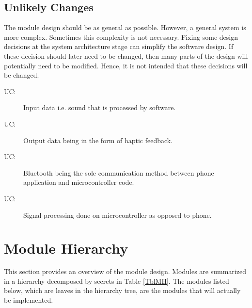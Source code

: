 \documentclass[12pt, titlepage]{article}
\newcounter{ucnum}
\newcommand{\uctheucnum}{UC\theucnum}
\begin{document}
\subsection{Unlikely Changes} \label{SecUchange}

The module design should be as general as possible. However, a general system is
more complex. Sometimes this complexity is not necessary. Fixing some design
decisions at the system architecture stage can simplify the software design. If
these decision should later need to be changed, then many parts of the design
will potentially need to be modified. Hence, it is not intended that these
decisions will be changed.

\begin{description}
  \item[ \uctheucnum \label{uc1}:] Input data i.e. sound that is processed by software.
  \item[ \uctheucnum \label{uc2}:] Output data being in the form of haptic feedback.
  \item[ \uctheucnum \label{uc3}:] Bluetooth being the sole communication method between phone application and microcontroller code.
  \item[ \uctheucnum \label{uc4}:] Signal processing done on microcontroller as opposed to phone.
\end{description}

\section{Module Hierarchy} \label{SecMH}

This section provides an overview of the module design. Modules are summarized
in a hierarchy decomposed by secrets in Table \ref{TblMH}. The modules listed
below, which are leaves in the hierarchy tree, are the modules that will
actually be implemented.
\end{document}

